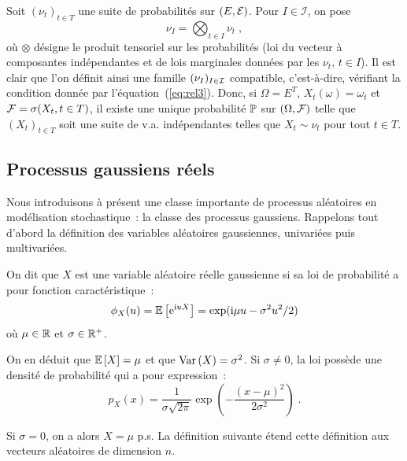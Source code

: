 \begin{example}
\label{exple:vaindep}
Soit $(\nu_t)_{t \in T}$ une suite
de probabilit\'es sur $(E,\mathcal{E})$. Pour $I\in\mathcal {I}$, on pose
\begin{equation}
\nu_I = \bigotimes_{t\in I} \nu_{t} \;,
\end{equation}
o\`u $\otimes$ d\'esigne le produit tensoriel sur les probabilit\'es (loi du
vecteur \`a composantes ind\'ependantes et de lois
marginales donn\'ees par les $\nu_t$, $t\in I$).
Il est clair que l'on d\'efinit ainsi une famille $(\nu_I)_{I \in
\mathcal{I}}$ compatible, c'est-\`a-dire, v\'erifiant la condition donn\'ee par
l'\'equation~(\ref{eq:rel3}). Donc, si $\Omega = E^{T}$,
$X_t(\omega)= \omega_t$ et $\mathcal{F} = \sigma(X_t, t \in T)$, il
existe une unique probabilit\'e $\mathbb{P}$ sur $(\Omega,\mathcal{F})$
telle que $(X_t)_{t \in T}$ soit une suite de v.a.
ind\'ependantes telles que $X_t\sim\nu_t$ pour tout $t\in T$.
\end{example}

\subsection{Processus gaussiens r\'eels}\label{sec:proc-gauss-reels}
Nous introduisons \`a pr\'esent une classe importante de processus al\'eatoires en
mod\'elisation stochastique~: la classe des processus gaussiens.
Rappelons tout d'abord la d\'efinition des variables al\'eatoires
gaussiennes, univari\'ees puis multivari\'ees.

\begin{definition}
 On dit que $X$ est une variable al\'eatoire r\'eelle gaussienne si
 sa loi de probabilit\'e a pour fonction caract\'eristique~:
 $$
   \phi_X(u)={\mathbb E}\left[ \mathrm{e}^{\mathrm{i} uX} \right]=\exp(\mathrm{i} \mu u -\sigma^2 u^2/2)
 $$
 o\`u $\mu\in \mathbb{R}$ et $\sigma\in\mathbb{R}^+$.
\end{definition}
 On en d\'eduit que ${\mathbb E}\left[ X \right]=\mu$ et que $\mathrm{Var}\left( X \right)=\sigma^2$. Si
$\sigma\neq 0$, la loi poss\`ede une densit\'e de probabilit\'e qui
a pour expression~:
\begin{equation}
  \label{eq:densite-gaussienne-unidim}
 p_X(x)=\frac{1}{\sigma\sqrt{2\pi}}
  \exp\left (-\frac{(x-\mu)^2}{2\sigma^2} \right)\;.
\end{equation}

Si $\sigma=0$, on a alors $X=\mu$ p.s.
La d\'efinition suivante \'etend cette
d\'efinition aux vecteurs al\'eatoires de dimension $n$.

